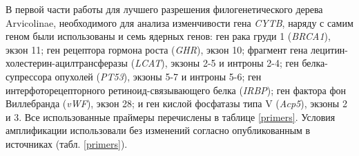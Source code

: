 В первой части работы для лучшего разрешения филогенетического дерева Arvicolinae, необходимого для анализа изменчивости гена \textit{CYTB}, наряду с самим геном были использованы и семь ядерных генов: ген рака груди 1 (\textit{BRCA1}), экзон 11; ген рецептора гормона роста (\textit{GHR}), экзон 10; фрагмент гена лецитин-холестерин-ацилтрансферазы (\textit{LCAT}), экзоны 2-5 и интроны 2-4; ген белка-супрессора опухолей (\textit{PT53}), экзоны 5-7 и интроны 5-6; ген интерфоторецепторного ретиноид-связывающего белка (\textit{IRBP}); ген фактора фон Виллебранда (\textit{vWF}), экзон 28; и ген кислой фосфатазы типа V (\textit{Acp5}), экзоны 2 и 3. Все использованные праймеры перечислены в таблице \ref{primers}. Условия амплификации использовали без изменений согласно опубликованным в источниках (табл. \ref{primers}). 

